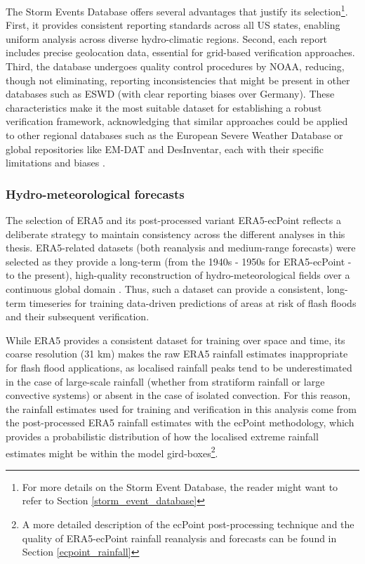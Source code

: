 The Storm Events Database offers several advantages that justify its selection\footnote{For more details on the Storm Event Database, the reader might want to refer to Section \ref{storm_event_database}}. First, it provides consistent reporting standards across all US states, enabling uniform analysis across diverse hydro-climatic regions. Second, each report includes precise geolocation data, essential for grid-based verification approaches. Third, the database undergoes quality control procedures by NOAA, reducing, though not eliminating, reporting inconsistencies that might be present in other databases such as ESWD (with clear reporting biases over Germany). These characteristics make it the most suitable dataset for establishing a robust verification framework, acknowledging that similar approaches could be applied to other regional databases such as the European Severe Weather Database or global repositories like EM-DAT and DesInventar, each with their specific limitations and biases \citep{Panwar_2020}.

\subsubsection{Hydro-meteorological forecasts}

The selection of ERA5 and its post-processed variant ERA5-ecPoint reflects a deliberate strategy to maintain consistency across the different analyses in this thesis. ERA5-related datasets (both reanalysis and medium-range forecasts) were selected as they provide a long-term (from the 1940s - 1950s for ERA5-ecPoint - to the present), high-quality reconstruction of hydro-meteorological fields over a continuous global domain \citep{Hersbach_2020}. Thus, such a dataset can provide a consistent, long-term timeseries for training data-driven predictions of areas at risk of flash floods and their subsequent verification.

While ERA5 provides a consistent dataset for training over space and time, its coarse resolution (31 km) makes the raw ERA5 rainfall estimates inappropriate for flash flood applications, as localised rainfall peaks tend to be underestimated in the case of large-scale rainfall (whether from stratiform rainfall or large convective systems) or absent in the case of isolated convection. For this reason, the rainfall estimates used for training and verification in this analysis come from the post-processed ERA5 rainfall estimates with the ecPoint methodology, which provides a probabilistic distribution of how the localised extreme rainfall estimates might be within the model gird-boxes\footnote{A more detailed description of the ecPoint post-processing technique and the quality of ERA5-ecPoint rainfall reanalysis and forecasts can be found in Section \ref{ecpoint_rainfall}}.

